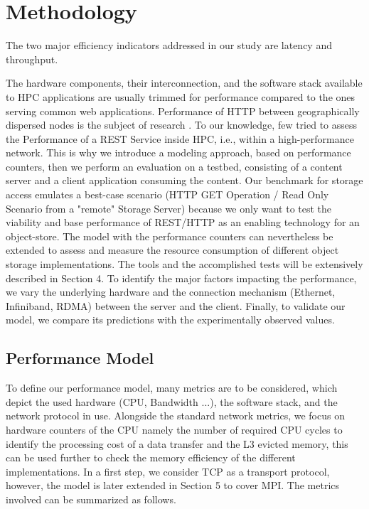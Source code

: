 \documentclass[runningheads]{llncs}
\begin{document}
\section {Methodology} \label{sec:methodology}
The two major efficiency indicators addressed in our study are latency and throughput.

The hardware components, their interconnection, and the software stack available to HPC applications are usually trimmed for performance compared to the ones serving common web applications. Performance of HTTP between geographically dispersed nodes is the subject of research \cite{tcpperfprediction}. To our knowledge, few tried to assess the Performance of a REST Service inside HPC, i.e., within a high-performance network. This is why we introduce a modeling approach, based on performance counters, then we perform an evaluation on a testbed, consisting of a content server and a client application consuming the content. Our benchmark for storage access emulates a best-case scenario (HTTP GET Operation / Read Only Scenario from a "remote" Storage Server) because we only want to test the viability and base performance of REST/HTTP as an enabling technology for an object-store. The model with the performance counters can nevertheless be extended to assess and measure the resource consumption of different object storage implementations. The tools and the accomplished tests will be extensively described in Section 4. To identify the major factors impacting the performance, we vary the underlying hardware and the connection mechanism (Ethernet, Infiniband, RDMA) between the server and the client. Finally, to validate our model, we compare its predictions with the experimentally observed values.

\subsection{Performance Model}
To define our performance model, many metrics are to be considered, which depict the used hardware (CPU, Bandwidth ...), the software stack, and the network protocol in use. Alongside the standard network metrics, we focus on hardware counters of the CPU namely the number of required CPU cycles to identify the processing cost of a data transfer and the L3 evicted memory, this can be used further to check the memory efficiency of the different implementations. In a first step, we consider TCP as a transport protocol, however, the model is later extended in Section 5 to cover MPI. The metrics involved can be summarized as follows.
\end{document}
